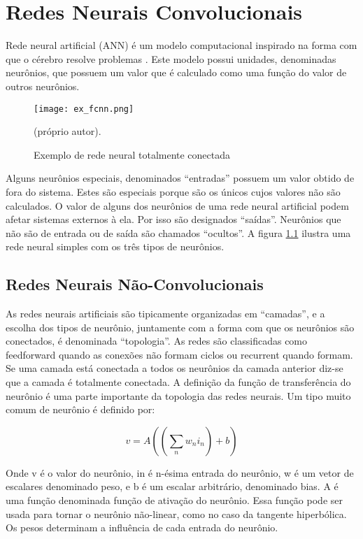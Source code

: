 
\chapter{Redes Neurais Convolucionais}
\setcounter{figure}{100}

Rede neural artificial (ANN) é um modelo computacional inspirado na forma com
que o cérebro resolve problemas \cite{gilbert2000build}. Este modelo possui
unidades, denominadas neurônios, que possuem um valor que é calculado como uma
função do valor de outros neurônios.

\begin{figure}[!htb]
	\centering
	\texttt{[image: ex\_fcnn.png]}
	\caption{Exemplo de rede neural totalmente conectada}
	\label{fig:ex_fcnn}
	(próprio autor).
\end{figure}

Alguns neurônios especiais, denominados “entradas” possuem um valor obtido de
fora do sistema. Estes são especiais porque são os únicos cujos valores não são
calculados. O valor de alguns dos neurônios de uma rede neural artificial podem
afetar sistemas externos à ela. Por isso são designados “saídas”. Neurônios que
não são de entrada ou de saída são chamados “ocultos”. A figura
\ref{fig:ex_fcnn} ilustra uma rede neural simples com os três tipos de
neurônios.

\section{Redes Neurais Não-Convolucionais}
As redes neurais artificiais são tipicamente organizadas em “camadas”, e a
escolha dos tipos de neurônio, juntamente com a forma com que os neurônios são
conectados, é denominada “topologia”. As redes são classificadas como
feedforward quando as conexões não formam ciclos ou recurrent quando formam. Se
uma camada está conectada a todos os neurônios da camada anterior diz-se que a
camada é totalmente conectada.
A definição da função de transferência do neurônio é uma parte importante da
topologia das redes neurais. Um tipo muito comum de neurônio é definido por:

\begin{equation} \label{eq:non-conv-layer}
	v=A \left( \left( \sum_n w_n i_n \right) + b \right)
\end{equation}

Onde v é o valor do neurônio, in é n-ésima entrada do neurônio, w é um vetor de
escalares denominado peso, e b é um escalar arbitrário, denominado bias. A é uma
função denominada função de ativação do neurônio. Essa função pode ser usada
para tornar o neurônio não-linear, como no caso da tangente hiperbólica. Os
pesos determinam a influência de cada entrada do neurônio.

